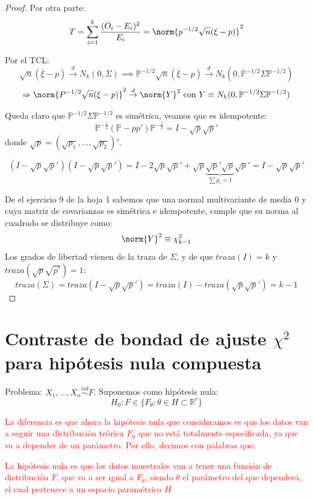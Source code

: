 \documentclass[palatino,nochap]{apuntes}
\begin{document}
\begin{proof}
Por otra parte: 
\[
T=\sum_{i=1}^k \frac{(O_i-E_i)^2}{E_i} = \norm{p^{-1/2}\sqrt{n}(\xi-p)}^2
\]

Por el TCL:
\[
\sqrt{n}(\overline{\xi}-p) \stackrel{d}{\rightarrow} N_k(0, \Sigma) \implies \mathbb{P}^{-1/2}\sqrt{n}(\overline{\xi}-p) \stackrel{d}{\rightarrow} N_k(0, \mathbb{P}^{-1/2} \Sigma  \mathbb{P}^{-1/2}) 
\]
\[
\Rightarrow \norm{P^{-1/2} \sqrt{n} (\xi-p)}^2 \stackrel{d}{\rightarrow} \norm{Y}^2 \text{ con } Y \equiv N_k(0,\mathbb{P}^{-1/2} \Sigma  \mathbb{P}^{-1/2})
\]

Queda claro que $\mathbb{P}^{-1/2} Σ  \mathbb{P}^{-1/2}$ es simétrica, veamos que es idempotente:
\[\mathbb{P}^{-\frac{1}{2}} (\mathbb{P} - pp') \mathbb{P}^{-\frac{1}{2}} = I-\sqrt{p}\sqrt{p}'\]
donde $\sqrt{p}=(\sqrt{p_1}, …, \sqrt{p_2})'$.

\[
(I-\sqrt{p}\sqrt{p}')(I-\sqrt{p}\sqrt{p}') = I-2\sqrt{p}\sqrt{p}'+\sqrt{p}\underbrace{\sqrt{p}'\sqrt{p}}_{\sum p_i=1}\sqrt{p}'=I-\sqrt{p}\sqrt{p}'
\]

De el ejercicio 9 de la hoja 1 sabemos que una normal multivariante de media 0 y cuya matriz de covarianzas es simétrica e idempotente, cumple que su norma al cuadrado se distribuye como:
\[
\norm{Y}^2 \equiv \chi^2_{k-1}
\]
Los grados de libertad vienen de la traza de $\Sigma$, y de que $traza(I)=k$ y $traza(\sqrt{p}\sqrt{p'})=1$: 
\[
traza(\Sigma)=traza(I-\sqrt{p}\sqrt{p}') = traza(I) - traza(\sqrt{p}\sqrt{p}')=k-1
\]
\end{proof}

\section{Contraste de bondad de ajuste $\chi^2$ para hipótesis nula compuesta}

Problema: $X_1,...,X_n \stackrel{iid}{\sim} F$. Suponemos como hipótesis nula:
\[
H_0 : F \in \{F_{\theta}: \theta \in H \subset \mathbb{R}^r\}
\]

\textcolor{red}{La diferencia es que ahora la hipótesis nula que consideramos es que los datos van a seguir una distribución teórica $F_0$ que no está totalmente especificada, ya que va a depender de un parámetro. Por ello, decimos con palabras que:}

\textcolor{red}{La hipótesis nula es que los datos muestrales van a tener una función de distribución $F$, que va a ser igual a $F_{\theta}$, siendo $\theta$ el parámetro del que dependerá, el cual pertenece a un espacio paramétrico $H$}
\end{document}
